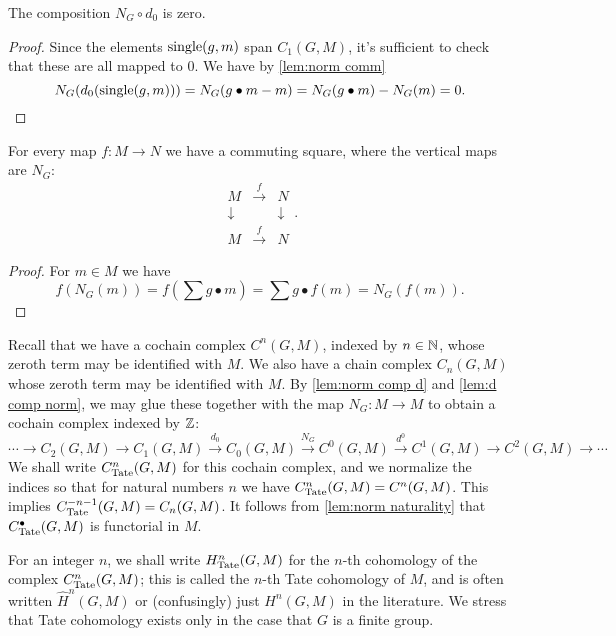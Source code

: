 \begin{lemma}	\label{lem:d comp norm}
	The composition $N_G \circ d_0$ is zero.
\end{lemma}

\begin{proof}
	Since the elements $\mathrm{single}(g,m)$ span $C_1(G,M)$, it's sufficient to check
	that these are all mapped to $0$.
	We have by \ref{lem:norm comm}
	\[
		N_G(d_0 (\mathrm{single}(g,m)))
		=
		N_G( g \bullet m - m)
		=
		N_G( g \bullet m) - N_G(m)
		= 0.
	\]
\end{proof}

\begin{lemma} \label{lem:norm naturality}
	For every map $f : M \to N$ we have a commuting square, where the
	vertical maps are $N_G$:
	\[
		\begin{matrix}
			M & \stackrel{f}\to & N \\
			\downarrow && \downarrow \\
			M & \stackrel{f}\to & N
		\end{matrix} .
	\]
\end{lemma}

\begin{proof}
	For $m \in M$ we have
	\[
		f(N_G (m)) = f\left( \sum g \bullet m\right)
		=\sum g \bullet f(  m)
		=N_G(f(m)).
	\]
\end{proof}

\begin{definition} \label{def:Tate cohomology}
	\leanok
	Recall that we have a cochain complex $C^n(G,M)$, indexed by $n \in {\mathbb N}$,
	whose zeroth term may be identified with $M$.
	We also have a chain complex $C_n(G,M)$ whose zeroth term may be identified with $M$.
	By \ref{lem:norm comp d} and \ref{lem:d comp norm}, we may glue these
	together with the map $N_G : M \to M$ to obtain	a cochain complex indexed by ${\mathbb Z}$:
	\[
		\cdots \to C_2(G,M) \to C_1(G,M) \stackrel{d_0}\to C_0(G,M)
		\stackrel{N_G}\to C^0(G,M) \stackrel{d^0}\to C^1(G,M) \to C^2(G,M) \to \cdots
	\]
	We shall write $C^n_{\mathrm{Tate}}(G,M)$ for this cochain complex,
	and we normalize the indices so that for
	natural numbers $n$ we have $C^n_{\mathrm{Tate}}(G,M) = C^n(G,M)$. This implies
	$C^{-n-1}_{\mathrm{Tate}}(G,M) = C_n(G,M)$.
	It follows from \ref{lem:norm naturality}
	that $C^\bullet_{\mathrm{Tate}}(G,M)$ is functorial in $M$.

	For an integer $n$, we shall write $H^n_{\mathrm{Tate}}(G,M)$ for the $n$-th cohomology of the complex
	$C^n_{\mathrm{Tate}}(G,M)$; this is called the $n$-th Tate cohomology of $M$,
	and is often written $\hat H^n(G,M)$ or (confusingly) just $H^n(G,M)$ in the literature.
	We stress that Tate cohomology exists only in the case that $G$ is a finite group.
\end{definition}

